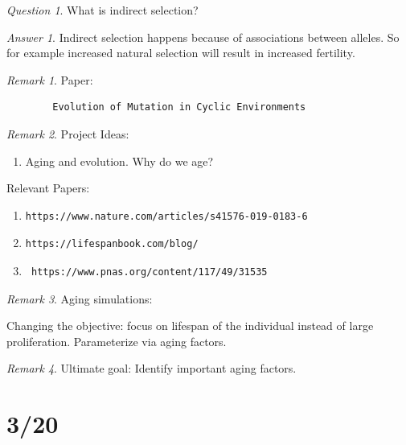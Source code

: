 \documentclass[11pt]{article}
\theoremstyle{remark}
\newtheorem{remark}{Remark}
\newtheorem{quest}{Question}
\newtheorem{ans}{Answer}
\begin{document}
\begin{quest}
	What is indirect selection?
\end{quest}

\begin{ans}
	Indirect selection happens because of associations between alleles. So for example increased natural selection will result in increased fertility.
\end{ans}

\begin{remark}
	Paper:
	\begin{verbatim}
		Evolution of Mutation in Cyclic Environments
	\end{verbatim}
\end{remark}

\begin{remark}
	Project Ideas:
	\begin{enumerate}
		\item Aging and evolution. Why do we age?
	\end{enumerate}
	Relevant Papers:
	\begin{enumerate}
		\item \begin{verbatim}https://www.nature.com/articles/s41576-019-0183-6\end{verbatim}
		\item \begin{verbatim}https://lifespanbook.com/blog/
		\end{verbatim}
		\item \begin{verbatim} https://www.pnas.org/content/117/49/31535\end{verbatim}
	\end{enumerate}
\end{remark}

\begin{remark}
	Aging simulations:
	
	Changing the objective: focus on lifespan of the individual instead of large proliferation. Parameterize via aging factors.
\end{remark}

\begin{remark}
	Ultimate goal: Identify important aging factors.
	
\end{remark}

\section{3/20}
\end{document}
